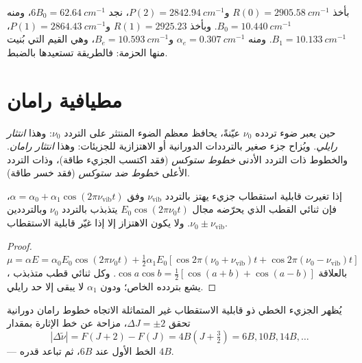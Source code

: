 \begin{example}\label{ex:b3:rovibrational-spectroscopy:analysis}
بأخذ $R(0) = \qty{2905.58}{cm^{-1}}$ و$P(2) = \qty{2842.94}{cm^{-1}}$، نجد
$6B_0 = \qty{62.64}{cm^{-1}}$، ومنه $B_0 = \qty{10.440}{cm^{-1}}$. وبأخذ $R(1) = 2925.23$ و$P(1) =
\qty{2864.43}{cm^{-1}}$، $B_1 = \qty{10.133}{cm^{-1}}$. ومنه $\alpha_e = \qty{0.307}{cm^{-1}}$
و$B_e = \qty{10.593}{cm^{-1}}$، وهي القيم التي بُنيت منها الحزمة:
فالطريقة تستعيدها بالضبط.
\end{example}

\section{مطيافية رامان}

\begin{definition}\label{def:b3:rovibrational-spectroscopy:raman}
حين يعبر ضوء تردده $\nu_0$ عيّنةً، يحافظ معظم الضوء المنتثر
على التردد $\nu_0$: وهذا \emph{انتثار رايلي}.
ويُزاح جزء صغير بالترددات الدورانية أو الاهتزازية
للجزيئات: وهذا \emph{انتثار رامان}.
والخطوط ذات التردد الأدنى \emph{خطوط ستوكس} (فقد
اكتسب الجزيء طاقة)، وذات التردد الأعلى \emph{خطوط ضد
ستوكس} (فقد خسر طاقة).
\end{definition}

\begin{proposition}\label{prop:b3:rovibrational-spectroscopy:raman-classical}
إذا تغيرت قابلية استقطاب جزيء يهتز بالتردد $\nu_{\mathrm{vib}}$
وفق $\alpha = \alpha_0 + \alpha_1\cos(2\pi\nu_{\mathrm{vib}}t)$، فإن ثنائي القطب الذي يحرّضه
مجال $E_0\cos(2\pi\nu_0t)$ يتذبذب بالتردد $\nu_0$ وبالترددين $\nu_0 \pm \nu_{\mathrm{vib}}$.
ولا يكون الاهتزاز  إلا إذا غيّر قابلية الاستقطاب.
\end{proposition}

\begin{proof}
$\mu = \alpha E = \alpha_0E_0\cos(2\pi\nu_0t) + \frac12\alpha_1E_0[\cos2\pi(\nu_0 +
\nu_{\mathrm{vib}})t + \cos2\pi(\nu_0 - \nu_{\mathrm{vib}})t]$، بالعلاقة $\cos a\cos b =
\frac12[\cos(a+b) + \cos(a-b)]$. وكل ثنائي قطب متذبذب يشع بتردده
الخاص؛ ودون $\alpha_1$ لا يبقى إلا حد رايلي.
\end{proof}

\begin{proposition}\label{prop:b3:rovibrational-spectroscopy:rotational-raman}
يُظهر الجزيء الخطي ذو قابلية الاستقطاب غير المتماثلة الاتجاه خطوط رامان دورانية
تحقق $\Delta J = \pm2$، مزاحة عن خط الإثارة بمقدار
\[
|\Delta\tilde\nu| = F(J+2) - F(J) = 4B(J + \tfrac32) = 6B, 10B, 14B, \dots
\]
--- الخط الأول عند $6B$، ثم تباعد قدره $4B$.
\end{proposition}

